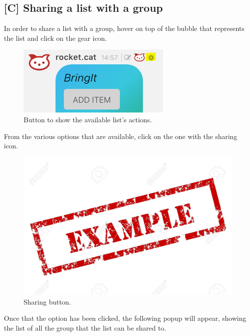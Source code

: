 \newpage
\subsection{[C] Sharing a list with a group}
In order to share a list with a group, hover on top of the bubble that represents the list and click on the gear icon.

\begin{figure}[H]
  \centering 
  \includegraphics[scale=1.0]{Sections/3-HowToUse/Images/list_gear_icon.png}
  \caption{Button to show the available list's actions.}
\end{figure}

From the various options that are available, click on the one with the sharing icon.

\begin{figure}[H]
  \centering 
  \includegraphics[width=\textwidth]{Sections/3-HowToUse/Images/example.jpeg}
  \caption{Sharing button.}
\end{figure}

Once that the option has been clicked, the following popup will appear, showing the list of all the group that the list can be shared to.

